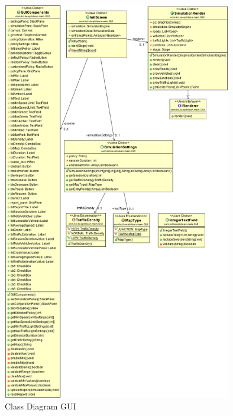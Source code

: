 \documentclass[11pt]{article}
\begin{document}
\begin{enumerate}
\begin{figure}[H]
        \includegraphics[width=10cm]{GUI} 
        \centering
        \caption{Class Diagram GUI } 
        \label{cdgui}
\end{figure}


\end{enumerate}
\end{document}
